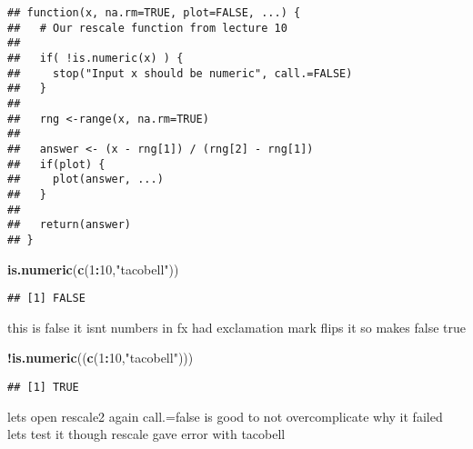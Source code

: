 \documentclass[]{article}
\newenvironment{Shaded}{\begin{snugshade}}{\end{snugshade}}
\newcommand{\KeywordTok}[1]{\textcolor[rgb]{0.13,0.29,0.53}{\textbf{#1}}}
\newcommand{\DecValTok}[1]{\textcolor[rgb]{0.00,0.00,0.81}{#1}}
\newcommand{\StringTok}[1]{\textcolor[rgb]{0.31,0.60,0.02}{#1}}
\newcommand{\OperatorTok}[1]{\textcolor[rgb]{0.81,0.36,0.00}{\textbf{#1}}}
\newcommand{\NormalTok}[1]{#1}
\begin{document}
\begin{verbatim}
## function(x, na.rm=TRUE, plot=FALSE, ...) {
##   # Our rescale function from lecture 10
## 
##   if( !is.numeric(x) ) {
##     stop("Input x should be numeric", call.=FALSE)
##   }
##   
##   rng <-range(x, na.rm=TRUE)
## 
##   answer <- (x - rng[1]) / (rng[2] - rng[1])
##   if(plot) { 
##     plot(answer, ...) 
##   }
## 
##   return(answer)
## }
\end{verbatim}

\begin{Shaded}
\begin{Highlighting}[]
\KeywordTok{is.numeric}\NormalTok{(}\KeywordTok{c}\NormalTok{(}\DecValTok{1}\OperatorTok{:}\DecValTok{10}\NormalTok{,}\StringTok{"tacobell"}\NormalTok{))}
\end{Highlighting}
\end{Shaded}

\begin{verbatim}
## [1] FALSE
\end{verbatim}

this is false it isnt numbers in fx had exclamation mark flips it so
makes false true

\begin{Shaded}
\begin{Highlighting}[]
\OperatorTok{!}\KeywordTok{is.numeric}\NormalTok{((}\KeywordTok{c}\NormalTok{(}\DecValTok{1}\OperatorTok{:}\DecValTok{10}\NormalTok{,}\StringTok{"tacobell"}\NormalTok{)))}
\end{Highlighting}
\end{Shaded}

\begin{verbatim}
## [1] TRUE
\end{verbatim}

lets open rescale2 again call.=false is good to not overcomplicate why
it failed lets test it though rescale gave error with tacobell
\end{document}
